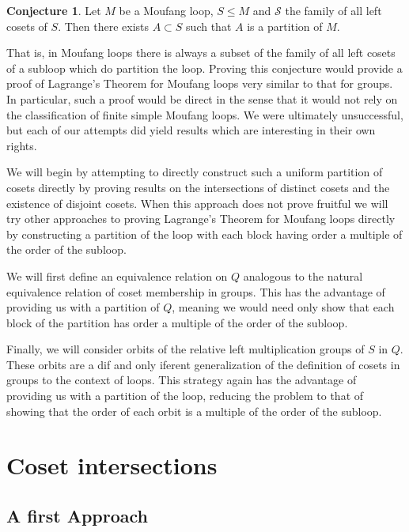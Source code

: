 \documentclass[12pt, twoside, openright]{report}
\theoremstyle{definition}
\newtheorem{cnj}[thm]{Conjecture}
\begin{document}
\begin{cnj}
  Let $M$ be a Moufang loop, $S \leq M$ and $\mathcal{S}$ the family of all left cosets of $S$.
    Then there exists $A\subset S$ such that $A$ is a partition of $M$.
\end{cnj}

That is, in Moufang loops there is always a subset of the family of all left cosets of a
  subloop which do partition the loop. Proving this conjecture would provide a proof of
  Lagrange's Theorem for Moufang loops very similar to that for groups. In particular,
  such a proof would be direct in the sense that it would not rely on the classification
  of finite simple Moufang loops. We were ultimately unsuccessful, but each of our attempts
  did yield results which are interesting in their own rights.

We will begin by attempting to directly construct such a uniform partition of cosets directly
  by proving results on the intersections of distinct cosets and the existence of disjoint
  cosets. When this approach does not prove fruitful we will try other approaches to proving
  Lagrange's Theorem for Moufang loops directly by constructing a partition of the loop with
  each block having order a multiple of the order of the subloop.

We will first define an equivalence relation on $Q$ analogous to the natural equivalence relation
  of coset membership in groups. This has the advantage of providing us with a partition of $Q$,
  meaning we would need only show that each block of the partition has order a multiple of the
  order of the subloop.

Finally, we will consider orbits of the relative left multiplication groups of $S$ in $Q$. These
  orbits are a dif and only iferent generalization of the definition of cosets in groups to the context of loops.
  This strategy again has the advantage of providing us with a partition of the loop, reducing the
  problem to that of showing that the order of each orbit is a multiple of the order of the subloop.


\section{Coset intersections}

\subsection{A first Approach}
\end{document}
